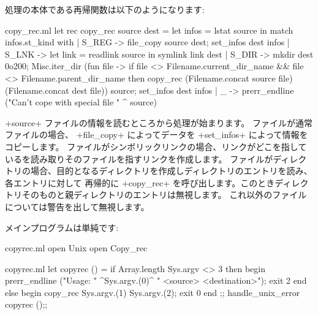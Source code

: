 処理の本体である再帰関数は以下のようになります:
\begin{listingcodefile}{copy_rec.ml}
let rec copy_rec source dest =
  let infos = lstat source in
  match infos.st_kind with
  | S_REG ->
      file_copy source dest;
      set_infos dest infos
  | S_LNK ->
      let link = readlink source in
      symlink link dest
  | S_DIR ->
      mkdir dest 0o200;
      Misc.iter_dir
        (fun file ->
          if file <> Filename.current_dir_name
              && file <> Filename.parent_dir_name
          then
            copy_rec
              (Filename.concat source file)
              (Filename.concat dest file))
        source;
      set_infos dest infos
  | _ ->
      prerr_endline ("Can't cope with special file " ^ source)
\end{listingcodefile}
%
\ml+source+ ファイルの情報を読むところから処理が始まります。
ファイルが通常ファイルの場合、 \ml+file_copy+ によってデータを \ml+set_infos+ によって情報をコピーします。
ファイルがシンボリックリンクの場合、リンクがどこを指しているを読み取りそのファイルを指すリンクを作成します。
ファイルがディレクトリの場合、目的となるディレクトリを作成しディレクトリのエントリを読み、各エントリに対して
再帰的に \ml+copy\_rec+ を呼び出します。このときディレクトリそのものと親ディレクトリのエントリは無視します。
これ以外のファイルについては警告を出して無視します。

メインプログラムは単純です:
%
\begin{codefile}{copyrec.ml}
open Unix
open Copy_rec
\end{codefile}
%
\begin{listingcodefile}{copyrec.ml}
let copyrec () =
  if Array.length Sys.argv <> 3 then begin
    prerr_endline ("Usage: " ^Sys.argv.(0)^ " <source> <destination>");
    exit 2
  end else begin
    copy_rec Sys.argv.(1) Sys.argv.(2);
    exit 0
  end
;;
handle_unix_error copyrec ();;
\end{listingcodefile}

